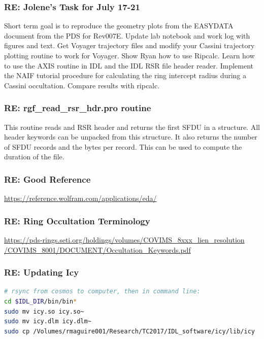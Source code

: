 \documentclass[crop=false,class=book]{standalone}
\begin{document}
\subsubsection{\footnotesize RE: Jolene's Task for July 17-21}
Short term goal is to reproduce the geometry plots from the EASYDATA document from the PDS for Rev007E. Update lab notebook and work log with figures and text. Get Voyager trajectory files and modify your Cassini trajectory plotting routine to work for Voyager. Show Ryan how to use Ripcalc. Learn how to use the AXIS routine in IDL and the IDL RSR file header reader. Implement the NAIF tutorial procedure for calculating the ring intercept radius during a Cassini occultation. Compare results with ripcalc. 
\subsubsection{\footnotesize RE: rgf\_read\_rsr\_hdr.pro routine}
This routine reads and RSR header and returns the first SFDU in a structure. All header keywords can be unpacked from this structure. It also returns the number of SFDU records and the bytes per record. This can be used to compute the duration of the file.
\subsubsection{\footnotesize RE: Good Reference}
\href{https://reference.wolfram.com/applications/eda/}{https://reference.wolfram.com/applications/eda/}
\subsubsection{\footnotesize RE: Ring Occultation Terminology}
\href{https://pds-rings.seti.org/holdings/volumes/COVIMS\_8xxx\_lien\_resolution/COVIMS\_8001/DOCUMENT/Occultation\_Keywords.pdf}{https://pds-rings.seti.org/holdings/volumes/COVIMS\_8xxx\_lien\_resolution \\ 
/COVIMS\_8001/DOCUMENT/Occultation\_Keywords.pdf}
\subsubsection{\footnotesize RE: Updating Icy}
\begin{lstlisting}[language=bash,basicstyle=\footnotesize]
# rsync from cosmos to computer, then in command line:
cd $IDL_DIR/bin/bin*
sudo mv icy.so icy.so~
sudo mv icy.dlm icy.dlm~
sudo cp /Volumes/rmaguire001/Research/TC2017/IDL_software/icy/lib/icy
\end{lstlisting}
\end{document}
